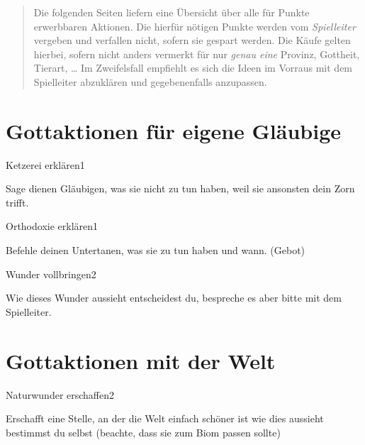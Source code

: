 \documentclass[PnP-Guide]{Lilly}
\begin{document}
\pnptitle
\pnptoc

\begin{abstract}
    Die folgenden Seiten liefern eine Übersicht über alle für Punkte erwerbbaren Aktionen. Die hierfür nötigen Punkte werden vom \emph{Spielleiter} vergeben und verfallen nicht, sofern sie gespart werden. Die Käufe gelten hierbei, sofern nicht anders vermerkt für nur \emph{genau eine} Provinz, Gottheit, Tierart, \ldots \newline
    Im Zweifelsfall empfiehlt es sich die Ideen im Vorraus mit dem Spielleiter abzuklären und gegebenenfalls anzupassen.
\end{abstract}



\section{Gottaktionen für eigene Gläubige}

\begin{option}[Gebot]{Ketzerei erklären}{1}

    Sage dienen Gläubigen, was sie nicht zu tun haben, weil sie ansonsten dein Zorn trifft.
\end{option}

\begin{option}[Gebot]{Orthodoxie erklären}{1}

    Befehle deinen Untertanen, was sie zu tun haben und wann. (Gebot)
\end{option}

\begin{option}{Wunder vollbringen}{2}

    Wie dieses Wunder aussieht entscheidest du, bespreche es aber bitte mit dem Spielleiter.
\end{option}


\clearpage

\section{Gottaktionen mit der Welt}

\begin{option}{Naturwunder erschaffen}{2}

    Erschafft eine Stelle, an der die Welt einfach schöner ist wie dies aussieht bestimmst du selbst (beachte, dass sie zum Biom passen sollte)
\end{option}

\end{document}
